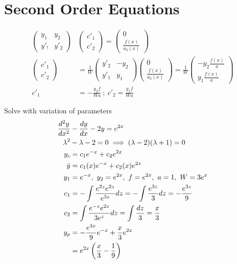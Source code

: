 \documentclass[Maths.tex]{subfiles}
\begin{document}
\section{Second Order Equations}
\begin{align*}
    \begin{pmatrix} y_1 & y_2 \\ y'_! & y'_2 \end{pmatrix} & \begin{pmatrix} c'_1 \\ c'_2 \end{pmatrix} = \begin{pmatrix} 0 \\ \frac{f(x)}{a_2(x)} \end{pmatrix} \\
    \begin{pmatrix} c'_1 \\ c'_2 \end{pmatrix} &= \frac{1}{W} \begin{pmatrix} y'_2 & -y_2 \\ y'_1 & y_1 \end{pmatrix} \begin{pmatrix} 0 \\ \frac{f(x)}{a_2(x)} \end{pmatrix} = \frac{1}{W}\begin{pmatrix} -y_2\frac{f(x)}{a} \\ y_1\frac{f(x)}{a} \end{pmatrix} \\
    c'_1 &= -\frac{y_2f}{Wa} ~;~ c'_2 = \frac{y_1f}{Wa}
\end{align*}

\begin{example}
Solve with variation of parameters
\begin{align*}
    \frac{d^2 y}{dx^2} &- \frac{dy}{dx} - 2y = e^{2x} \\
    \lambda^2 &- \lambda - 2 = 0 \implies (\lambda-2)(\lambda+1) = 0 \\
    y_c &= c_1e^{-x} + c_2e^{2x} \\
    \tilde{y} &= c_1(x)e^{-x} + c_2(x)e^{2x} \\
    y_1 &= e^{-x},~ y_2 = e^{2x},~ f = e^{2x},~ a = 1,~ W = 3e^x \\
    c_1 &= -\int \frac{e^{2z}e^{2z}}{e^{3z}}dz = -\int \frac{e^{3z}}{3}dz = -\frac{e^{3z}}{9} \\
    c_2 &= \int \frac{e^{-z}e^{2z}}{3e^z}dz = \int \frac{dz}{3} = \frac{x}{3} \\
    y_p &= -\frac{e^{3x}}{9}e^{-x} + \frac{x}{3}e^{2x} \\
    &= e^{2x}\left(\frac{x}{3} - \frac{1}{9}\right)
\end{align*}
\end{example}
\end{document}
